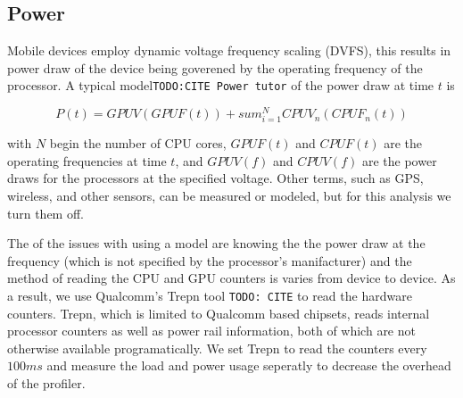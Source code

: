 \subsection{Power}

Mobile devices employ dynamic voltage frequency scaling (DVFS),
  this results in power draw of the device being goverened by
  the operating frequency of the processor.
A typical model{\tt TODO:CITE Power tutor} of the power draw at time $t$ is

$$
P(t) = GPUV(GPUF(t)) + sum_{i=1}^{N} CPUV_n(CPUF_n(t))
$$

with $N$ begin the number of CPU cores, $GPUF(t)$ and $CPUF(t)$ are the operating frequencies at time $t$, and $GPUV(f)$ and $CPUV(f)$ are the power draws for the processors at the specified voltage.
Other terms, such as GPS, wireless, and other sensors, can be measured or modeled, but for this analysis we turn them off.

The of the issues with using a model are knowing the the power draw at the 
  frequency (which is not specified by the processor's manifacturer) and the method of reading
  the CPU and GPU counters is varies from device to device.
As a result, we use Qualcomm's Trepn tool {\tt TODO: CITE} to read the hardware
  counters.
Trepn, which is limited to Qualcomm based chipsets, reads internal processor
  counters as well as power rail information, both of which are not otherwise
  available programatically.
We set Trepn to read the counters every $100ms$ and measure the load and power
  usage seperatly to decrease the overhead of the profiler.



